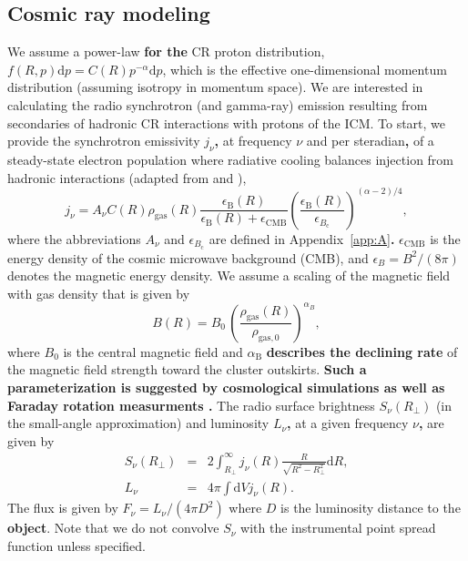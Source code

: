\documentclass[traditabstract]{aa}
\def\C#1{{\bf #1}}
\newcommand{\rmn}{\mathrm}
\newcommand{\dd}{\mathrm{d}}
\begin{document}
\subsection{Cosmic ray modeling}
\label{sec:2.3}
We assume a power-law \C{for the} CR proton distribution, $f(R,p) \dd p=C(R) p^{-\alpha} \dd p$,
which is the effective one-dimensional momentum distribution (assuming isotropy
in momentum space). We are interested in calculating the radio synchrotron (and
gamma-ray) emission resulting from secondaries of hadronic CR interactions with
protons of the ICM. To start, we provide the synchrotron emissivity $j_{\nu}$\C{,} at
frequency $\nu$ and per steradian\C{,} of a steady-state electron population where
radiative cooling balances injection from hadronic interactions (adapted from
\citealp{2008MNRAS.385.1211P} and \citealp{2011A&A...527A..99E}),
\begin{equation}
j_{\nu}  =  A_\nu C(R) \rho_{\rmn{gas}}(R) 
\frac{\epsilon_{\rmn{B}}(R)}{\epsilon_{\rmn{B}}(R)+\epsilon_{\rmn{CMB}}} 
\left( \frac{\epsilon_{\rmn{B}}(R)}{\epsilon_{B_{\rmn{c}}}} \right)^{(\alpha-2)/4},
\label{eq:jnu}
\end{equation}
where the abbreviations $A_\nu$ and $\epsilon_{B_{\rmn{c}}}$ are defined in
Appendix~\ref{app:A}\C{.} $\epsilon_{\rmn{CMB}}$ is the energy density of the cosmic
microwave background (CMB), and $\epsilon_B=B^{2}/(8\pi)$ denotes the magnetic
energy density. We assume a scaling of the magnetic field with gas density that
is given by
\begin{equation}
B(R) = B_0\,\left(\frac{\rho_{\rmn{gas}}(R)}{\rho_{\rmn{gas},0}}\right)^{\alpha_B},
\label{eq:B}
\end{equation}
where $B_0$ is the central magnetic field and $\alpha_{\rmn{B}}$ \C{describes
the declining rate} of the magnetic field strength toward the
cluster outskirts. \C{Such a parameterization is suggested by cosmological 
simulations \citep{2008A&A...482L..13D} as well as Faraday 
rotation measurments \citep[][and references therein]{2010A&A...513A..30B,
2011A&A...529A..13K}.} 
The radio surface brightness $S_{\nu}(R_{\perp})$ (in the
small-angle approximation) and luminosity $L_{\nu}$\C{,} at a given frequency $\nu$\C{,}
are given by
\begin{eqnarray}
S_\nu(R_{\perp}) &=& 2 \int_{R_{\perp}}^{\infty} j_{\nu}(R) \frac{R}{\sqrt{R^{2}-R_{\perp}^{2}}} \rmn{d}R, \label{eq:surf} \\
L_{\nu}  &=&  4 \pi \int \dd V j_\nu(R).
\label{eq:lum}
\end{eqnarray}
The flux is given by $F_{\nu}=L_{\nu}/(4\pi D^{2})$ where $D$ is the luminosity
distance to the \C{object}. Note that we do not convolve $S_\nu$ with the instrumental
point spread function unless specified.
\end{document}
